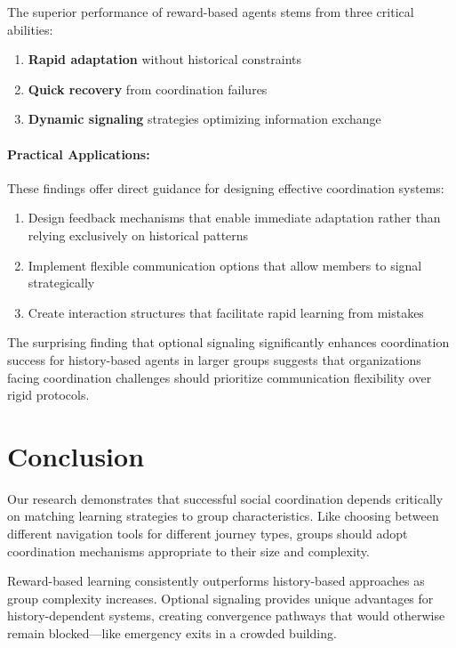 \documentclass[12pt,a4paper]{article}
\begin{document}
The superior performance of reward-based agents stems from three critical abilities:

\begin{enumerate}
    \item \textbf{Rapid adaptation} without historical constraints
    \item \textbf{Quick recovery} from coordination failures
    \item \textbf{Dynamic signaling} strategies optimizing information exchange
\end{enumerate}

\paragraph{Practical Applications:} These findings offer direct guidance for designing effective coordination systems:

\begin{enumerate}
    \item Design feedback mechanisms that enable immediate adaptation rather than relying exclusively on historical patterns
    \item Implement flexible communication options that allow members to signal strategically
    \item Create interaction structures that facilitate rapid learning from mistakes
\end{enumerate}

The surprising finding that optional signaling significantly enhances coordination success for history-based agents in larger groups suggests that organizations facing coordination challenges should prioritize communication flexibility over rigid protocols.

\section{Conclusion}

Our research demonstrates that successful social coordination depends critically on matching learning strategies to group characteristics. Like choosing between different navigation tools for different journey types, groups should adopt coordination mechanisms appropriate to their size and complexity.

Reward-based learning consistently outperforms history-based approaches as group complexity increases. Optional signaling provides unique advantages for history-dependent systems, creating convergence pathways that would otherwise remain blocked—like emergency exits in a crowded building.
\end{document}
